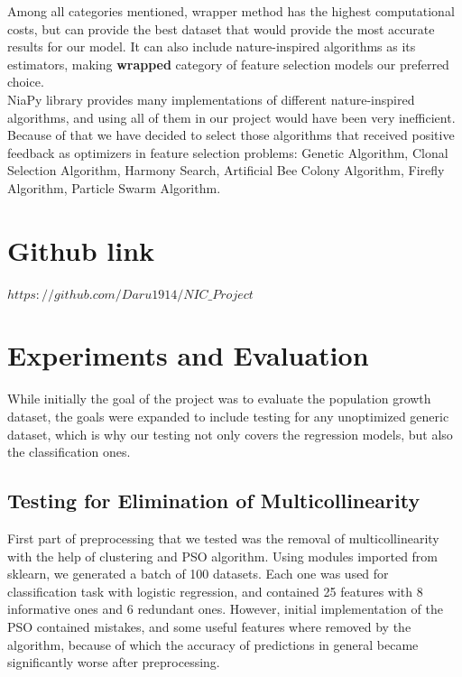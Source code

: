 \documentclass[conference]{IEEEtran}
\begin{document}
Among all categories mentioned, wrapper method has the highest computational costs, but can provide the best dataset that would provide the most accurate results for our model. It can also include nature-inspired algorithms as its estimators, making \textbf{wrapped} category of feature selection models our preferred choice.\\

NiaPy library provides many implementations of different nature-inspired algorithms, and using all of them in our project would have been very inefficient. Because of that we have decided to select those algorithms that received positive feedback as optimizers in feature selection problems: Genetic Algorithm, Clonal Selection Algorithm, Harmony Search, Artificial Bee Colony Algorithm, Firefly Algorithm, Particle Swarm Algorithm\cite{fister2013brief}.\\ 

\section{Github link}
$https://github.com/Daru1914/NIC\_Project$

\section{Experiments and Evaluation}

While initially the goal of the project was to evaluate the population growth dataset, the goals were expanded to include testing for any unoptimized generic dataset, which is why our testing not only covers the regression models, but also the classification ones.

\subsection{Testing for Elimination of Multicollinearity}

First part of preprocessing that we tested was the removal of multicollinearity with the help of clustering and PSO algorithm. Using modules imported from sklearn, we generated a batch of 100 datasets. Each one was used for classification task with logistic regression, and contained 25 features with 8 informative ones and 6 redundant ones. However, initial implementation of the PSO contained mistakes, and some useful features where removed by the algorithm, because of which the accuracy of predictions in general became significantly worse after preprocessing.\\
\end{document}
